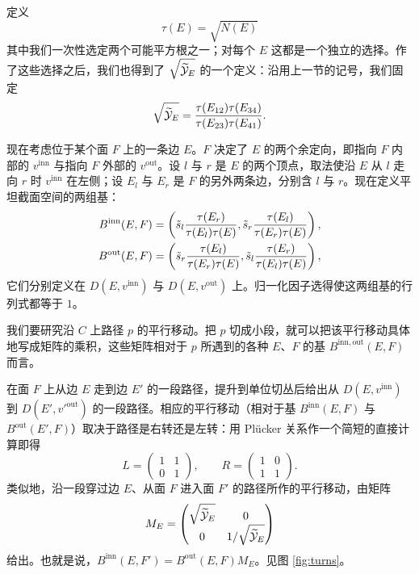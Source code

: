 定义
\begin{equation}
\tau(E) = \sqrt{N(E)}
\end{equation}
其中我们一次性选定两个可能平方根之一；对每个 $E$ 这都是一个独立的选择。作了这些选择之后，我们也得到了 $\sqrt{\widetilde{\cal Y}_E}$ 的一个定义：沿用上一节的记号，我们固定
\begin{equation}
\sqrt{\widetilde{\cal Y}_E} = \frac{\tau(E_{12}) \tau(E_{34})}{\tau(E_{23}) \tau(E_{41})}.
\end{equation}

现在考虑位于某个面 $F$ 上的一条边 $E$。$F$ 决定了 $E$ 的两个余定向，即指向 $F$ 内部的 $v^{\mathrm{inn}}$ 与指向 $F$ 外部的 $v^{\mathrm{out}}$。设 $l$ 与 $r$ 是 $E$ 的两个顶点，取法使沿 $E$ 从 $l$ 走向 $r$ 时 $v^{\mathrm{inn}}$ 在左侧；设 $E_l$ 与 $E_r$ 是 $F$ 的另外两条边，分别含 $l$ 与 $r$。现在定义平坦截面空间的两组基：
\begin{align}
 B^{\mathrm{inn}}(E,F) &= \left( \tilde{s}_l \frac{\tau(E_r)}{\tau(E_l) \tau(E)}, \tilde{s}_r \frac{\tau(E_l)}{\tau(E_r) \tau(E)} \right), \\
 B^{\mathrm{out}}(E,F) &= \left( \tilde{s}_r \frac{\tau(E_l)}{\tau(E_r) \tau(E)}, \tilde{s}_l \frac{\tau(E_r)}{\tau(E_l) \tau(E)} \right),
\end{align}
它们分别定义在 $D(E, v^{\mathrm{inn}})$ 与 $D(E, v^{\mathrm{out}})$ 上。归一化因子选得使这两组基的行列式都等于 $1$。

我们要研究沿 $C$ 上路径 $p$ 的平行移动。把 $p$ 切成小段，就可以把该平行移动具体地写成矩阵的乘积，这些矩阵相对于 $p$ 所遇到的各种 $E$、$F$ 的基 $B^{\mathrm{inn},\mathrm{out}}(E,F)$ 而言。

在面 $F$ 上从边 $E$ 走到边 $E'$ 的一段路径，提升到单位切丛后给出从 $D(E, v^{\mathrm{inn}})$ 到 $D(E', v'^{\mathrm{out}})$ 的一段路径。相应的平行移动（相对于基 $B^{\mathrm{inn}}(E,F)$ 与 $B^{\mathrm{out}}(E',F)$）取决于路径是右转还是左转：用 Pl\"ucker 关系作一个简短的直接计算即得
\begin{equation}
 L = \begin{pmatrix} 1 & 1 \\ 0 & 1 \end{pmatrix}, \qquad R = \begin{pmatrix} 1 & 0 \\ 1 & 1 \end{pmatrix}.
\end{equation}
类似地，沿一段穿过边 $E$、从面 $F$ 进入面 $F'$ 的路径所作的平行移动，由矩阵
\begin{equation}
 M_E = \begin{pmatrix} \sqrt{\widetilde{\cal Y}_E} & 0 \\ 0 & 1 / \sqrt{\widetilde{\cal Y}_E} \end{pmatrix}
\end{equation}
给出。也就是说，$B^{\mathrm{inn}}(E,F') = B^{\mathrm{out}}(E,F) M_E$。见图 \ref{fig:turns}。

